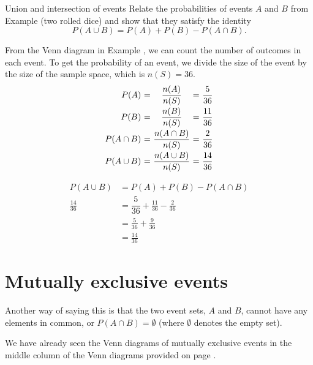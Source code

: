 \begin{wex}{Union and intersection of events}
{Relate the probabilities of events $A$ and $B$ from
  Example 
  (two rolled dice) and show that they satisfy the identity
  \[P(A \cup B) = P(A) + P(B) - P(A \cap B).\]
}{
  
  From the Venn diagram
  in Example ,
 we can count the number of outcomes in each
  event. To get the probability of an event, we divide the size of
  the event by the size of the sample space, which is $n(S)=36$.
  \[\begin{array}{r@{$\ =\ $}c@{$\ =\ $}l}
    P(A)        & \dfrac{n(A)}{n(S)}        & \dfrac{5}{36}  \\[8pt]
    P(B)        & \dfrac{n(B)}{n(S)}        & \dfrac{11}{36} \\[8pt]
    P(A \cap B) & \dfrac{n(A \cap B)}{n(S)} & \dfrac{2}{36}  \\[8pt]
    P(A \cup B) & \dfrac{n(A \cup B)}{n(S)} & \dfrac{14}{36}
  \end{array}\]

  \begin{align*}
    P(A \cup B) &= P(A) + P(B) - P(A \cap B) \\
    \frac{14}{36} &= \dfrac{5}{36} + \frac{11}{36} - \frac{2}{36} \\
    &= \frac{5}{36} + \frac{9}{36} \\
    &= \frac{14}{36} 
  \end{align*}
}
\end{wex}

\section{Mutually exclusive events}

Another way of saying this is that the two event sets, $A$ and $B$,
cannot have any elements in common, or $P(A \cap B) = \emptyset$
(where $\emptyset$ denotes the empty set).

We have already seen the Venn diagrams of mutually exclusive events in
the middle column of the Venn diagrams provided on page \pageref{fig:venn_union_intersection}.

